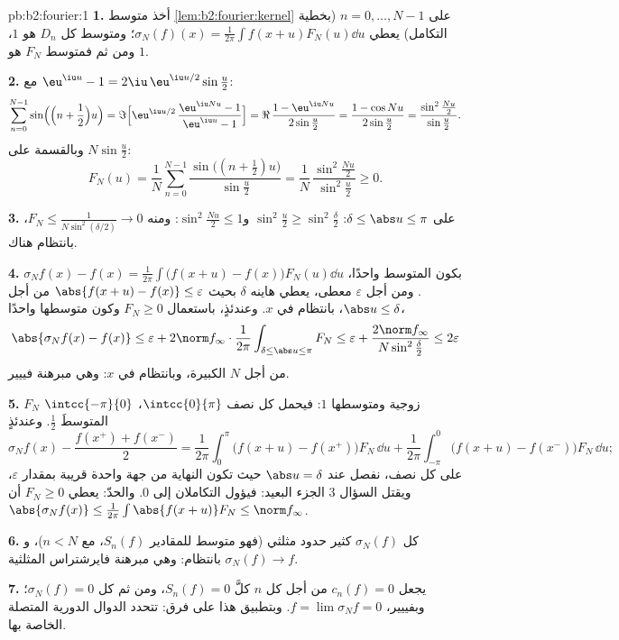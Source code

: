 \begin{solution}{pb:b2:fourier:1}
\textbf{1.} أخذ متوسط \cref{lem:b2:fourier:kernel} على $n = 0,
\dots, N-1$ (بخطية التكامل) يعطي $\sigma_N(f)(x) =
\frac{1}{2\pi}\int f(x+u)F_N(u)\dd u$؛ ومتوسط كل $D_n$ هو
$1$، ومن ثم فمتوسط $F_N$ هو $1$.

\textbf{2.} مع $\eu^{\iu u} - 1 = 2\iu\,\eu^{\iu
u/2}\sin\frac u2$:
\[
\sum_{n=0}^{N-1}\sin\Bigl(\Bigl(n + \frac12\Bigr)u\Bigr)
= \Im\Bigl[\eu^{\iu u/2}\,\frac{\eu^{\iu Nu} - 1}{\eu^{\iu u}
- 1}\Bigr]
= \Re\,\frac{1 - \eu^{\iu Nu}}{2\sin\frac u2}
= \frac{1 - \cos Nu}{2\sin\frac u2}
= \frac{\sin^2\frac{Nu}2}{\sin\frac u2} .
\]
وبالقسمة على $N\sin\frac u2$:
\[
F_N(u) = \frac1N\sum_{n=0}^{N-1}
\frac{\sin\bigl((n+\frac12)u\bigr)}{\sin\frac u2}
= \frac{1}{N}\,
\frac{\sin^2\frac{Nu}{2}}{\sin^2\frac u2} \geq 0 .
\]

\textbf{3.} على $\delta \leq \abs u \leq \pi$: $\sin^2\frac u2
\geq \sin^2\frac\delta2$ و$\sin^2\frac{Nu}2 \leq 1$: ومنه $F_N
\leq \frac{1}{N\sin^2(\delta/2)} \to 0$، بانتظام هناك.

\textbf{4.} بكون المتوسط واحدًا، $\sigma_Nf(x) - f(x) =
\frac{1}{2\pi}\int\bigl(f(x+u) - f(x)\bigr)F_N(u)\dd u$. ومن أجل
$\varepsilon$ معطى، يعطي هاينه $\delta$ بحيث $\abs{f(x+u) - f(x)}
\leq \varepsilon$ من أجل $\abs u \leq \delta$، بانتظام في $x$.
وعندئذٍ، باستعمال $F_N \geq 0$ وكون متوسطها واحدًا،
\[
\abs{\sigma_Nf(x) - f(x)}
\leq \varepsilon +
2\norm f_\infty\cdot\frac{1}{2\pi}
\int_{\delta\leq\abs u\leq\pi}F_N
\leq \varepsilon + \frac{2\norm
f_\infty}{N\sin^2\frac\delta2}
\leq 2\varepsilon
\]
من أجل $N$ الكبيرة، وبانتظام في $x$: وهي مبرهنة فييير.

\textbf{5.} $F_N$ زوجية ومتوسطها $1$: فيحمل كل نصف
$\intcc{0}{\pi}$، $\intcc{-\pi}{0}$ المتوسطَ $\frac12$.
وعندئذٍ
\[
\sigma_Nf(x) - \frac{f(x^+)+f(x^-)}{2}
= \frac{1}{2\pi}\int_0^\pi\bigl(f(x+u) -
f(x^+)\bigr)F_N\,\dd u
+ \frac{1}{2\pi}\int_{-\pi}^0\bigl(f(x+u) -
f(x^-)\bigr)F_N\,\dd u ;
\]
على كل نصف، نفصل عند $\abs u = \delta$ حيث تكون النهاية من جهة
واحدة قريبة بمقدار $\varepsilon$، ويقتل السؤال 3 الجزء
البعيد: فيؤول التكاملان إلى $0$. والحدّ: يعطي $F_N \geq 0$
أن $\abs{\sigma_Nf(x)} \leq
\frac{1}{2\pi}\int\abs{f(x+u)}F_N \leq \norm f_\infty$.

\textbf{6.} كل $\sigma_N(f)$ كثير حدود مثلثي
(فهو متوسط للمقادير $S_n(f)$، مع $n < N$)، و$\sigma_N(f) \to f$
بانتظام: وهي مبرهنة فايرشتراس المثلثية.

\textbf{7.} يجعل $c_n(f) = 0$ من أجل كل $n$ كلَّ $S_n(f) = 0$،
ومن ثم كل $\sigma_N(f) = 0$؛ وبفييير، $f = \lim\sigma_Nf =
0$. وبتطبيق هذا على فرق: تتحدد الدوال الدورية
المتصلة  الخاصة بها.


\end{solution}
